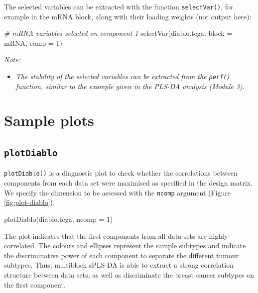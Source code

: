 \documentclass[
]{book}
\newenvironment{Shaded}{\begin{snugshade}}{\end{snugshade}}
\newcommand{\AttributeTok}[1]{\textcolor[rgb]{0.77,0.63,0.00}{#1}}
\newcommand{\CommentTok}[1]{\textcolor[rgb]{0.56,0.35,0.01}{\textit{#1}}}
\newcommand{\DecValTok}[1]{\textcolor[rgb]{0.00,0.00,0.81}{#1}}
\newcommand{\FunctionTok}[1]{\textcolor[rgb]{0.00,0.00,0.00}{#1}}
\newcommand{\NormalTok}[1]{#1}
\newcommand{\StringTok}[1]{\textcolor[rgb]{0.31,0.60,0.02}{#1}}
\providecommand{\tightlist}{%
  \setlength{\itemsep}{0pt}\setlength{\parskip}{0pt}}
\begin{document}
The selected variables can be extracted with the function \texttt{selectVar()}, for example in the mRNA block, along with their loading weights (not output here):

\begin{Shaded}
\begin{Highlighting}[]
\CommentTok{\# mRNA variables selected on component 1}
\FunctionTok{selectVar}\NormalTok{(diablo.tcga, }\AttributeTok{block =} \StringTok{\textquotesingle{}mRNA\textquotesingle{}}\NormalTok{, }\AttributeTok{comp =} \DecValTok{1}\NormalTok{)}
\end{Highlighting}
\end{Shaded}

\emph{Note:}

\begin{itemize}
\tightlist
\item
  \emph{The stability of the selected variables can be extracted from the \texttt{perf()} function, similar to the example given in the PLS-DA analysis (Module 3).}
\end{itemize}

\hypertarget{diablo:result:sampleplot}{%
\section{Sample plots}\label{diablo:result:sampleplot}}

\hypertarget{plotdiablo}{%
\subsection{\texorpdfstring{\texttt{plotDiablo}}{plotDiablo}}\label{plotdiablo}}

\texttt{plotDiablo()} is a diagnostic plot to check whether the correlations between components from each data set were maximised as specified in the design matrix. We specify the dimension to be assessed with the \texttt{ncomp} argument (Figure \ref{fig:plot-diablo}).

\begin{Shaded}
\begin{Highlighting}[]
\FunctionTok{plotDiablo}\NormalTok{(diablo.tcga, }\AttributeTok{ncomp =} \DecValTok{1}\NormalTok{)}
\end{Highlighting}
\end{Shaded}



The plot indicates that the first components from all data sets are highly correlated. The colours and ellipses represent the sample subtypes and indicate the discriminative power of each component to separate the different tumour subtypes. Thus, multiblock sPLS-DA is able to extract a strong correlation structure between data sets, as well as discriminate the breast cancer subtypes on the first component.
\end{document}
